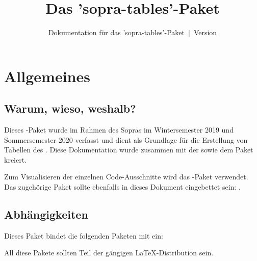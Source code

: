 \documentclass{sopra-base}
\title{Das 'sopra-tables'-Paket}
\subtitle[Dokumentation für das 'sopra-tables'-Paket]{Dokumentation für das 'sopra-tables'-Paket~$\mid$~Version \thesotversion}
\begin{document}
    \maketitle%
%
%

%
%
%
%

\section{Allgemeines}
\subsection{Warum, wieso, weshalb?}
    Dieses \LaTeXe-Paket wurde im Rahmen des Sopras im 
    Wintersemester 2019 und Sommersemester 2020 verfasst und dient als
    Grundlage für die Erstellung von Tabellen
    des . Diese Dokumentation wurde zusammen mit der 
     sowie dem Paket  kreiert.\par
    Zum Visualisieren der einzelnen Code-Ausschnitte wird das
    -Paket verwendet.
    Das zugehörige Paket sollte ebenfalls in dieses Dokument eingebettet sein: .
\subsection{Abhängigkeiten}
    Dieses Paket bindet die folgenden Paketen mit ein:
    \begin{multicols}{3}
    \end{multicols}
    All diese Pakete sollten Teil der gängigen \LaTeX-Distribution sein.
\end{document}
